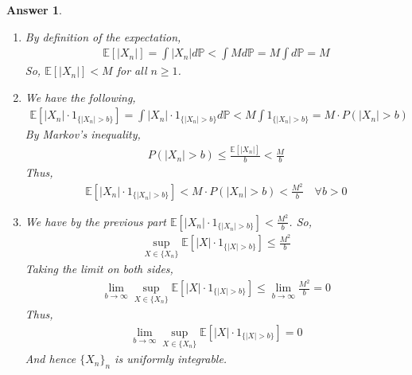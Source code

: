 \documentclass[12pt]{article}
\theoremstyle{colon}
\newtheorem*{answer}{Answer}
\begin{document}
\begin{answer}
  \leavevmode
  \begin{enumerate}[label=\roman*)]
    \item By definition of the expectation,
      \begin{gather*}
        \mathbb{E}[\lvert X_n \rvert] = \int \lvert X_n \rvert d\mathbb{P} < \int M d\mathbb{P} = M \int d\mathbb{P} = M
      \end{gather*}
      So, $\mathbb{E}[\lvert X_n \rvert] < M$ for all $n \geq 1$.

    \item We have the following,
      \begin{gather*}
        \mathbb{E}[\lvert X_n \rvert \cdot 1_{\{ \lvert X_n \rvert > b \}}] = \int \lvert X_n \rvert \cdot 1_{\{ \lvert X_n \rvert > b \}} d \mathbb{P} < M \int 1_{\{ \lvert X_n \rvert > b \}} = M \cdot P(\lvert X_n \rvert > b)
      \end{gather*}
      By Markov's inequality,
      \begin{gather*}
        P(\lvert X_n \rvert > b) \leq \frac{\mathbb{E}[\lvert X_n \rvert]}{b} < \frac{M}{b}
      \end{gather*}
      Thus,
      \begin{gather*}
        \mathbb{E}[\lvert X_n \rvert \cdot 1_{\{ \lvert X_n \rvert > b \}}] < M \cdot P(\lvert X_n \rvert > b) < \frac{M^2}{b} \quad \forall b > 0
      \end{gather*}

    \item We have by the previous part $\mathbb{E}[\lvert X_n \rvert \cdot 1_{\{ \lvert X_n \rvert > b \}}] < \frac{M^2}{b}$. So,
      \begin{gather*}
        \sup_{X \in \{X_n\}} \mathbb{E}[\lvert X \rvert \cdot 1_{\{ \lvert X \rvert > b \}}] \leq \frac{M^2}{b}
      \end{gather*}
      Taking the limit on both sides,
      \begin{gather*}
        \lim_{b \rightarrow \infty} \sup_{X \in \{X_n\}} \mathbb{E}[\lvert X \rvert \cdot 1_{\{ \lvert X \rvert > b \}}] \leq \lim_{b \rightarrow \infty} \frac{M^2}{b} = 0
      \end{gather*}
      Thus,
      \begin{gather*}
        \lim_{b \rightarrow \infty} \sup_{X \in \{X_n\}} \mathbb{E}[\lvert X \rvert \cdot 1_{\{ \lvert X \rvert > b \}}] = 0
      \end{gather*}
      And hence $\{ X_n \}_n$ is uniformly integrable.
  \end{enumerate}
\end{answer}
\end{document}
